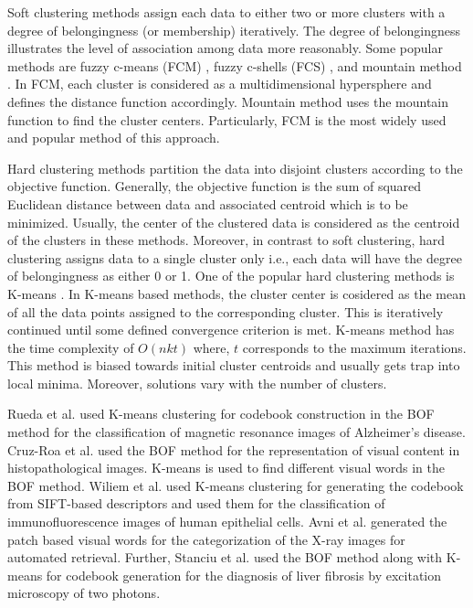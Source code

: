 \begin{itemize}
Soft clustering methods assign each data to either two or more clusters with a degree of belongingness (or membership) iteratively. The degree of belongingness illustrates the level of association among data more reasonably.  Some popular methods are fuzzy c-means (FCM) \cite{bezdek1973cluster}, fuzzy c-shells (FCS) \cite{dave1992adaptive}, and mountain method \cite{yager1994approximate}. In FCM, each cluster is considered as a multidimensional hypersphere and defines the distance function accordingly. Mountain method uses the mountain function to find the cluster centers. Particularly, FCM is the most widely used and popular method of this approach.

Hard clustering methods partition the data into disjoint clusters according to the objective function. Generally, the objective function is the sum of squared Euclidean distance between data and associated centroid which is to be minimized. Usually, the center of the clustered data is considered as the centroid of the clusters in these methods. Moreover, in contrast to soft clustering, hard clustering assigns data to a single cluster only i.e., each data will have the degree of belongingness as either 0 or 1. One of the popular hard clustering methods is K-means \cite{wang2015}. In K-means based methods, the cluster center is cosidered as the mean of all the data points assigned to the corresponding cluster. This is iteratively continued until some defined convergence criterion is met. K-means method has the time complexity of $O(nkt)$ \cite{saxena2017review} where, $t$ corresponds to the maximum iterations. This method is biased towards initial cluster centroids and usually gets trap into local minima. Moreover, solutions vary with the number of clusters. 

Rueda et al. \cite{rueda2012bag} used K-means clustering for codebook construction in the BOF method for the classification of magnetic resonance images of Alzheimer's disease. Cruz-Roa et al. \cite{cruz2011} used the BOF method for the representation of visual content in histopathological images. K-means is used to find different visual words in the BOF method. Wiliem et al. \cite{wiliem2013classification} used K-means clustering for generating the codebook from SIFT-based descriptors and used them for the classification of immunofluorescence images of human epithelial cells. Avni et al. \cite{Avni2010} generated the patch based visual words for the categorization of the X-ray images for automated retrieval. Further, Stanciu et al. \cite{Stanciu2014} used the BOF method along with K-means for codebook generation for the diagnosis of liver fibrosis by excitation microscopy of two photons. 


\end{itemize}
